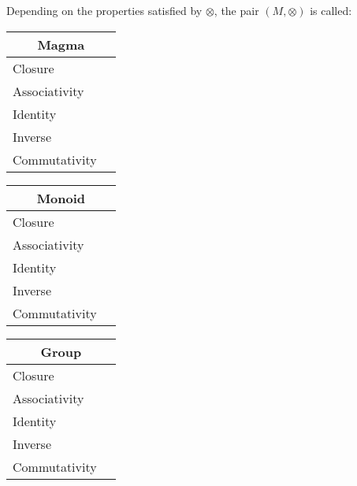 \documentclass[a4paper,12pt]{scrartcl}    %
\newcommand{\OpA}{\otimes}
\begin{document}
Depending on the properties satisfied by $\OpA$, the pair $(M,\OpA)$ is called:

\begin{minipage}[c]{0,5\textwidth}

\begin{tabular}{|l|p{2cm}|} %
  \hline
  \multicolumn{2}{c}{\cellcolor{yellow!25}Magma} \\
  \hline
   \cellcolor{blue!25} Closure&  \\
    \cellcolor{red!25} Associativity&  \\
    \cellcolor{red!25} Identity&  \\
    \cellcolor{red!25} Inverse&  \\
    \cellcolor{red!25} Commutativity&  \\
  \hline
\end{tabular}

\vspace{0.6cm}
\begin{tabular}{|l|p{2cm}|} %
  \hline
  \multicolumn{2}{c}{\cellcolor{yellow!25}Monoid} \\
  \hline
   \cellcolor{blue!25} Closure&  \\
    \cellcolor{blue!25} Associativity&  \\
    \cellcolor{blue!25} Identity&  \\
    \cellcolor{red!25} Inverse&  \\
    \cellcolor{red!25} Commutativity&  \\
  \hline
\end{tabular}

\vspace{0.6cm}
\begin{tabular}{|l|p{2cm}|} %
  \hline
  \multicolumn{2}{c}{\cellcolor{yellow!25}Group} \\
  \hline
   \cellcolor{blue!25} Closure&  \\
    \cellcolor{blue!25} Associativity&  \\
    \cellcolor{blue!25} Identity&  \\
    \cellcolor{blue!25} Inverse&  \\
    \cellcolor{red!25} Commutativity&  \\
  \hline
\end{tabular}

\end{minipage}
\end{document}
